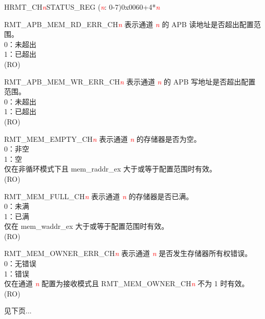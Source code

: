 \begin{register}{H}{RMT\_CH\textcolor{red}{\it{n}}STATUS\_REG (\textcolor{red}{\it{n}}: 0-7)}{0x0060+4*\textcolor{red}{\it{n}}}\label{regdesc:RMTCHnSTATUSREG}
%
%
%
%
%
%
%
%
%
%
\regnewline%
\begin{regdesc}\begin{reglist}
\item [RMT\_APB\_MEM\_RD\_ERR\_CH\textcolor{red}{\it{n}}] 表示通道 \textcolor{red}{\it{n}} 的 APB 读地址是否超出配置范围。\\
0：未超出\\
1：已超出\\(RO)
\item [RMT\_APB\_MEM\_WR\_ERR\_CH\textcolor{red}{\it{n}}] 表示通道 \textcolor{red}{\it{n}} 的 APB 写地址是否超出配置范围。\\
0：未超出\\
1：已超出\\(RO)
\item [RMT\_MEM\_EMPTY\_CH\textcolor{red}{\it{n}}] 表示通道 \textcolor{red}{\it{n}} 的存储器是否为空。\\
0：非空\\
1：空\\
仅在非循环模式下且 mem\_raddr\_ex 大于或等于配置范围时有效。\\(RO)
\item [RMT\_MEM\_FULL\_CH\textcolor{red}{\it{n}}] 表示通道 \textcolor{red}{\it{n}} 的存储器是否已满。\\
0：未满\\
1：已满\\
仅在 mem\_waddr\_ex 大于或等于配置范围时有效。\\(RO)
\item [RMT\_MEM\_OWNER\_ERR\_CH\textcolor{red}{\it{n}}] 表示通道 \textcolor{red}{\it{n}} 是否发生存储器所有权错误。\\
0：无错误\\
1：错误\\
仅在通道 \textcolor{red}{\it{n}} 配置为接收模式且 RMT\_MEM\_OWNER\_CH\textcolor{red}{\it{n}} 不为 1 时有效。\\(RO)

\item [见下页...]
\end{reglist}\end{regdesc}
\end{register}
